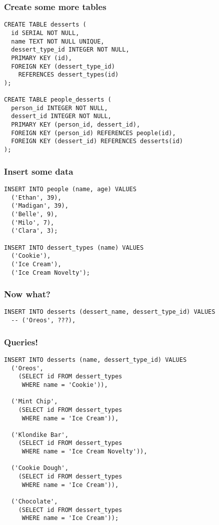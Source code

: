 \documentclass{beamer}
\begin{document}
\begin{frame}[fragile]
  \frametitle{Create some more tables}

  \begin{lstlisting}
CREATE TABLE desserts (
  id SERIAL NOT NULL,
  name TEXT NOT NULL UNIQUE,
  dessert_type_id INTEGER NOT NULL,
  PRIMARY KEY (id),
  FOREIGN KEY (dessert_type_id)
    REFERENCES dessert_types(id)
);

CREATE TABLE people_desserts (
  person_id INTEGER NOT NULL,
  dessert_id INTEGER NOT NULL,
  PRIMARY KEY (person_id, dessert_id),
  FOREIGN KEY (person_id) REFERENCES people(id),
  FOREIGN KEY (dessert_id) REFERENCES desserts(id)
);

  \end{lstlisting}

\end{frame}


\begin{frame}[fragile]
  \frametitle{Insert some data}
  \begin{lstlisting}
INSERT INTO people (name, age) VALUES
  ('Ethan', 39),
  ('Madigan', 39),
  ('Belle', 9),
  ('Milo', 7),
  ('Clara', 3);

INSERT INTO dessert_types (name) VALUES
  ('Cookie'),
  ('Ice Cream'),
  ('Ice Cream Novelty');
  \end{lstlisting}
\end{frame}

\begin{frame}[fragile]
  \frametitle{Now what?}
  \begin{lstlisting}
INSERT INTO desserts (dessert_name, dessert_type_id) VALUES
  -- ('Oreos', ???),
  \end{lstlisting}
\end{frame}

\begin{frame}[fragile]
  \frametitle{Queries!}
  \begin{lstlisting}
INSERT INTO desserts (name, dessert_type_id) VALUES
  ('Oreos',
    (SELECT id FROM dessert_types
     WHERE name = 'Cookie')),

  ('Mint Chip',
    (SELECT id FROM dessert_types
     WHERE name = 'Ice Cream')),

  ('Klondike Bar',
    (SELECT id FROM dessert_types
     WHERE name = 'Ice Cream Novelty')),

  ('Cookie Dough',
    (SELECT id FROM dessert_types
     WHERE name = 'Ice Cream')),

  ('Chocolate',
    (SELECT id FROM dessert_types
     WHERE name = 'Ice Cream'));
  \end{lstlisting}
\end{frame}
\end{document}
